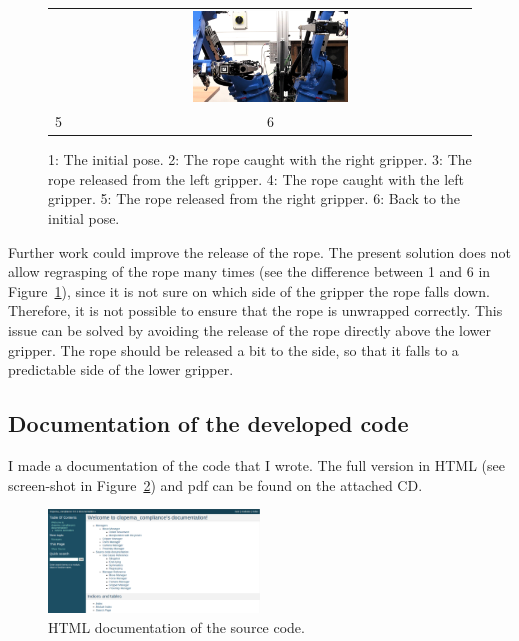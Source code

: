 \begin{figure}[h]
\begin{tabular}{c|c}
            &
            \includegraphics[width=0.4\textwidth]{Img/regrasping/SwitchArmsRight.png} \\
            5 & 6 \\

            \end{tabular}
            \caption{1: The initial pose. 2: The rope caught with the right gripper. 3: The rope released from the left gripper. 4: The rope caught with the left gripper. 5: The rope released from the right gripper. 6: Back to the initial pose.}
            \label{fig:RegraspingProcess}
        \end{figure}

        Further work could improve the release of the rope. The present solution does not allow regrasping of the rope many times (see the difference between 1 and 6 in Figure~\ref{fig:RegraspingProcess}), since it is not sure on which side of the gripper the rope falls down. Therefore, it is not possible to ensure that the rope is unwrapped correctly. This issue can be solved by avoiding the release of the rope directly above the lower gripper. The rope should be released a bit to the side, so that it falls to a predictable side of the lower gripper.

    \subsection{Documentation of the developed code}
        I made a documentation of the code that I wrote. The full version in HTML (see screen-shot in Figure~\ref{fig:DocHTML}) and pdf can be found on the attached CD.

        \begin{figure}[h!]
        \includegraphics[width=0.5\textwidth]{Img/conclusion/DocHTML.png}
        \centering
        \caption{HTML documentation of the source code.}
        \label{fig:DocHTML}
        \end{figure}

